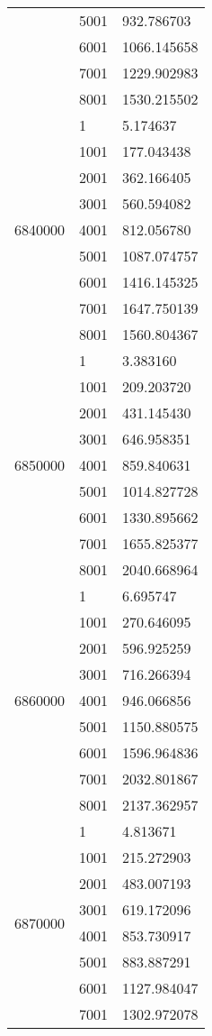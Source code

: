 \begin{table}[htb!]
\begin{tabular}{lll}
 & 5001 & 932.786703 \\
 & 6001 & 1066.145658 \\
 & 7001 & 1229.902983 \\
 & 8001 & 1530.215502 \\
\multirow[c]{9}{*}{6840000} & 1 & 5.174637 \\
 & 1001 & 177.043438 \\
 & 2001 & 362.166405 \\
 & 3001 & 560.594082 \\
 & 4001 & 812.056780 \\
 & 5001 & 1087.074757 \\
 & 6001 & 1416.145325 \\
 & 7001 & 1647.750139 \\
 & 8001 & 1560.804367 \\
\multirow[c]{9}{*}{6850000} & 1 & 3.383160 \\
 & 1001 & 209.203720 \\
 & 2001 & 431.145430 \\
 & 3001 & 646.958351 \\
 & 4001 & 859.840631 \\
 & 5001 & 1014.827728 \\
 & 6001 & 1330.895662 \\
 & 7001 & 1655.825377 \\
 & 8001 & 2040.668964 \\
\multirow[c]{9}{*}{6860000} & 1 & 6.695747 \\
 & 1001 & 270.646095 \\
 & 2001 & 596.925259 \\
 & 3001 & 716.266394 \\
 & 4001 & 946.066856 \\
 & 5001 & 1150.880575 \\
 & 6001 & 1596.964836 \\
 & 7001 & 2032.801867 \\
 & 8001 & 2137.362957 \\
\multirow[c]{9}{*}{6870000} & 1 & 4.813671 \\
 & 1001 & 215.272903 \\
 & 2001 & 483.007193 \\
 & 3001 & 619.172096 \\
 & 4001 & 853.730917 \\
 & 5001 & 883.887291 \\
 & 6001 & 1127.984047 \\
 & 7001 & 1302.972078 \\

\end{tabular}
\end{table}
